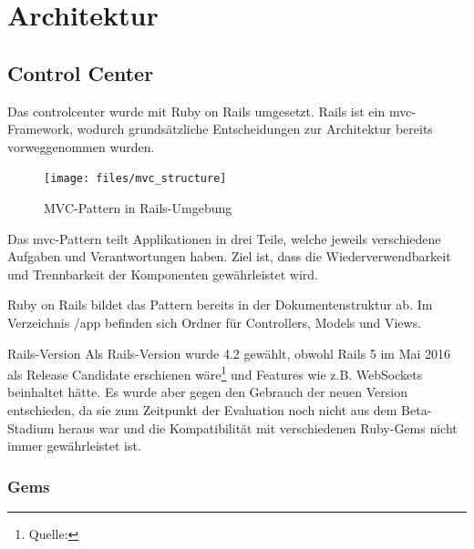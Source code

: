 \section{Architektur}

\subsection*{Control Center}

Das \gls{controlcenter} wurde mit Ruby on Rails umgesetzt. Rails ist ein \gls{mvc}-Framework, wodurch grundsätzliche Entscheidungen zur Architektur bereits vorweggenommen wurden.

\begin{figure}[H]
	\centering
	\texttt{[image: files/mvc\_structure]}
	\caption{MVC-Pattern in Rails-Umgebung}
	\label{fig:tec:mvc}
\end{figure}

Das \gls{mvc}-Pattern teilt Applikationen in drei Teile, welche jeweils verschiedene Aufgaben und Verantwortungen haben. Ziel ist, dass die Wiederverwendbarkeit und Trennbarkeit der Komponenten gewährleistet wird.

Ruby on Rails bildet das Pattern bereits in der Dokumentenstruktur ab. Im Verzeichnis /app befinden sich Ordner für Controllers, Models und Views.

\begin{decision}{Rails-Version}
Als Rails-Version wurde 4.2 gewählt, obwohl Rails 5 im Mai 2016 als Release Candidate erschienen wäre\footnote{Quelle: } und Features wie z.B. WebSockets beinhaltet hätte. Es wurde aber gegen den Gebrauch der neuen Version entschieden, da sie zum Zeitpunkt der Evaluation noch nicht aus dem Beta-Stadium heraus war und die Kompatibilität mit verschiedenen Ruby-Gems nicht immer gewährleistet ist.
\end{decision}

\subsubsection*{Gems}

